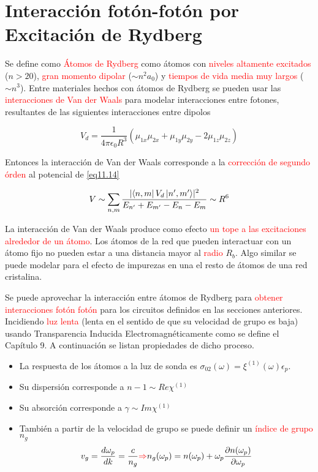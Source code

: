 \documentclass{book}
\begin{document}
\section{Interacción fotón-fotón por Excitación de Rydberg}

Se define como \textcolor{red}{Átomos de Rydberg} como átomos con \textcolor{red}{niveles altamente excitados} ($n>20$), \textcolor{red}{gran momento dipolar} ($\sim n^2a_0$) y \textcolor{red}{tiempos de vida media muy largos} ($\sim n^3$). Entre materiales hechos con átomos de Rydberg se pueden usar las \textcolor{red}{interacciones de Van der Waals} para modelar interacciones entre fotones, resultantes de las siguientes interacciones entre dipolos

\begin{equation}\label{eq11.14}V_d=\frac{1}{4\pi\epsilon_0R^3}(\mu_{1x}\mu_{2x}+\mu_{1y}\mu_{2y}-2\mu_{1z}\mu_{2z})\end{equation}

Entonces la interacción de Van der Waals corresponde a la \textcolor{red}{corrección de segundo órden} al potencial de \ref{eq11.14}

\begin{equation}\label{eq11.15}V\sim \sum_{n,m}\frac{\lvert\bra{n,m}V_d\ket{n^\prime, m^\prime}\rvert^2}{E_{n^\prime}+E_{m^\prime}-E_n-E_m}\sim R^6\end{equation}

La interacción de Van der Waals produce como efecto \textcolor{red}{un tope a las excitaciones alrededor de un átomo}. Los átomos de la red que pueden interactuar con un átomo fijo no pueden estar a una distancia mayor al \textcolor{red}{radio} $R_b$. Algo similar se puede modelar para el efecto de impurezas en una el resto de átomos de una red cristalina.

Se puede aprovechar la interacción entre átomos de Rydberg para \textcolor{red}{obtener interacciones fotón fotón} para los circuitos definidos en las secciones anteriores. Incidiendo \textcolor{red}{luz lenta} (lenta en el sentido de que su velocidad de grupo es baja) usando Transparencia Inducida Electromagnéticamente como se define el Capítulo 9. A continuación se listan propiedades de dicho proceso.
\begin{itemize}
\item La respuesta de los átomos a la luz de sonda es $\sigma_{02}(\omega)=\xi^{(1)}(\omega)\epsilon_p$. 
\item Su dispersión corresponde a $n-1\sim Re \chi^{(1)}$
\item Su absorción corresponde a $\gamma\sim Im \chi^{(1)}$
\item También a partir de la velocidad de grupo se puede definir un \textcolor{red}{índice de grupo} $n_g$
\begin{equation}\label{eq11.16}v_g=\frac{d\omega_p}{dk}=\frac{c}{n_g}\textcolor{red}{\Rightarrow} n_g(\omega_p)=n(\omega_p)+\omega_p\frac{\partial n(\omega_p)}{\partial \omega_p}\end{equation}
\end{itemize}
\end{document}
